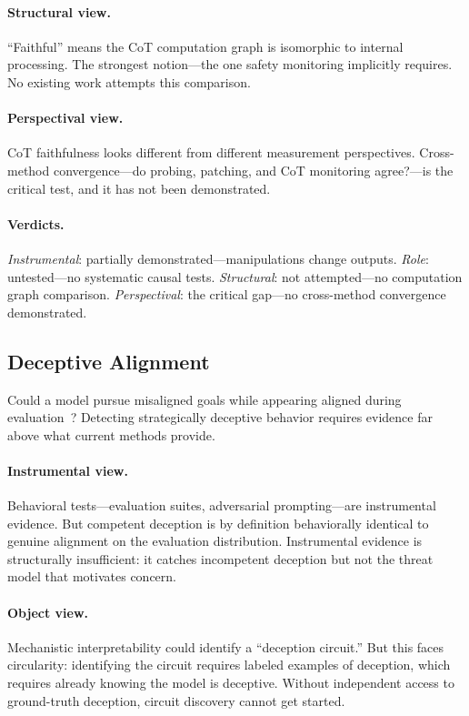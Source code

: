 \documentclass{article}
\begin{document}
\paragraph{Structural view.}
``Faithful'' means the CoT computation graph is isomorphic to internal
processing. The strongest notion---the one safety monitoring implicitly
requires. No existing work attempts this comparison.

\paragraph{Perspectival view.}
CoT faithfulness looks different from different measurement perspectives.
Cross-method convergence---do probing, patching, and CoT monitoring
agree?---is the critical test, and it has not been demonstrated.

\paragraph{Verdicts.}
\emph{Instrumental}: partially demonstrated---manipulations change
outputs.
\emph{Role}: untested---no systematic causal tests.
\emph{Structural}: not attempted---no computation graph comparison.
\emph{Perspectival}: the critical gap---no cross-method convergence
demonstrated.



\subsection{Deceptive Alignment}\label{app:cs_deception}

Could a model pursue misaligned goals while appearing aligned during
evaluation~\citep{hubinger2021risks}? Detecting strategically deceptive
behavior requires evidence far above what current methods provide.

\paragraph{Instrumental view.}
Behavioral tests---evaluation suites, adversarial prompting---are
instrumental evidence. But competent deception is by definition
behaviorally identical to genuine alignment on the evaluation
distribution. Instrumental evidence is structurally insufficient: it
catches incompetent deception but not the threat model that motivates
concern.

\paragraph{Object view.}
Mechanistic interpretability could identify a ``deception circuit.'' But
this faces circularity: identifying the circuit requires labeled examples
of deception, which requires already knowing the model is deceptive.
Without independent access to ground-truth deception, circuit discovery
cannot get started.
\end{document}
